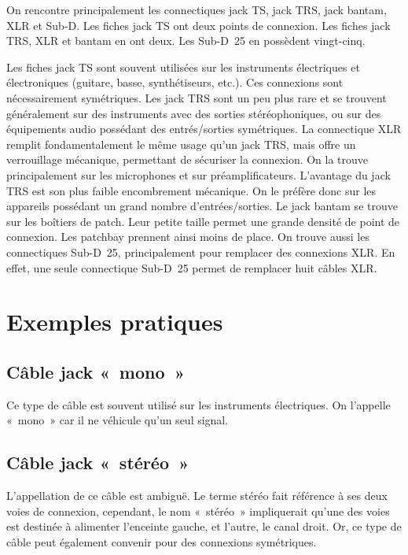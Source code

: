\documentclass[
]{book}
\begin{document}
On rencontre principalement les connectiques jack TS, jack TRS, jack bantam, XLR et Sub-D. Les fiches jack TS ont deux points de connexion. Les fiches jack TRS, XLR et bantam en ont deux. Les Sub-D~25 en possèdent vingt-cinq.

Les fiches jack TS sont souvent utilisées sur les instruments électriques et électroniques (guitare, basse, synthétiseurs, etc.). Ces connexions sont nécessairement symétriques. Les jack TRS sont un peu plus rare et se trouvent généralement sur des instruments avec des sorties stéréophoniques, ou sur des équipements audio possédant des entrés/sorties symétriques. La connectique XLR remplit fondamentalement le même usage qu'un jack TRS, mais offre un verrouillage mécanique, permettant de sécuriser la connexion. On la trouve principalement sur les microphones et sur préamplificateurs. L'avantage du jack TRS est son plus faible encombrement mécanique. On le préfère donc sur les appareils possédant un grand nombre d'entrées/sorties. Le jack bantam se trouve sur les boîtiers de patch. Leur petite taille permet une grande densité de point de connexion. Les patchbay prennent ainsi moins de place. On trouve aussi les connectiques Sub-D~25, principalement pour remplacer des connexions XLR. En effet, une seule connectique Sub-D~25 permet de remplacer huit câbles XLR.

\hypertarget{exemples-pratiques}{%
\section{Exemples pratiques}\label{exemples-pratiques}}

\hypertarget{cuxe2ble-jack-mono}{%
\subsection{Câble jack «~mono~»}\label{cuxe2ble-jack-mono}}

Ce type de câble est souvent utilisé sur les instruments électriques. On l'appelle «~mono~» car il ne véhicule qu'un seul signal.

\hypertarget{cuxe2ble-jack-stuxe9ruxe9o}{%
\subsection{Câble jack «~stéréo~»}\label{cuxe2ble-jack-stuxe9ruxe9o}}

L'appellation de ce câble est ambiguë. Le terme stéréo fait référence à ses deux voies de connexion, cependant, le nom «~stéréo~» impliquerait qu'une des voies est destinée à alimenter l'enceinte gauche, et l'autre, le canal droit. Or, ce type de câble peut également convenir pour des connexions symétriques.
\end{document}
